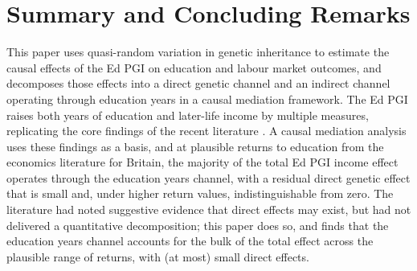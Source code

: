 \section{Summary and Concluding Remarks}
\label{sec:conclusion}
This paper uses quasi-random variation in genetic inheritance to estimate the causal effects of the Ed PGI on education and labour market outcomes, and decomposes those effects into a direct genetic channel and an indirect channel operating through education years in a causal mediation framework.
The Ed PGI raises both years of education and later-life income by multiple measures, replicating the core findings of the recent literature \citep{carvalho2024genetics}.
A causal mediation analysis uses these findings as a basis, and at plausible returns to education from the economics literature for Britain, the majority of the total Ed PGI income effect operates through the education years channel, with a residual direct genetic effect that is small and, under higher return values, indistinguishable from zero.
The literature had noted suggestive evidence that direct effects may exist, but had not delivered a quantitative decomposition; this paper does so, and finds that the education years channel accounts for the bulk of the total effect across the plausible range of returns, with (at most) small direct effects.

